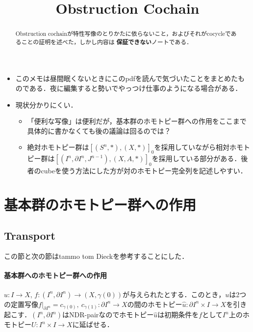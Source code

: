 \documentclass[a4paper,11pt]{jsarticle}
\theoremstyle{definition}
\begin{document}
\begin{itemize}
  \item このメモは昼間眠くないときにこのpdfを読んで気づいたことをまとめたものである．夜に編集すると勢いでやっつけ仕事のようになる場合がある．
  \item 現状分かりにくい．\begin{itemize}
    \item 「便利な写像」は便利だが，基本群のホモトピー群への作用をここまで具体的に書かなくても後の議論は回るのでは？
    \item 絶対ホモトピー群は$[(S^n,*),(X,*)]_0$を採用していながら相対ホモトピー群は$[(I^n,\partial I^n,J^{n-1}),(X,A,*)]_0$を採用している部分がある．後者のcubeを使う方法にした方が対のホモトピー完全列を記述しやすい．
  \end{itemize}
\end{itemize}

\date{}
\title{Obstruction Cochain}

\maketitle

\begin{abstract}
  Obstruction cochainが特性写像のとりかたに依らないこと，およびそれがcocycleであることの証明を述べた，しかし内容は{\HUGE\bfseries \color{red} 保証できない}ノートである．
\end{abstract}
\tableofcontents
\section{基本群のホモトピー群への作用}
\subsection{Transport}
この節と次の節はtammo tom Dieckを参考することにした．

\paragraph{基本群へのホモトピー群への作用}
$u\colon I\to X$, $f\colon(I^n,\partial I^n)\to (X,\gamma(0))$が与えられたとする．このとき，$u$は2つの定置写像$f|_{\partial I^n}=c_{\gamma(0)},\ c_{\gamma(1)}\colon \partial I^n\to X$の間のホモトピー$\hat u\colon \partial I^n\times I\to X$を引き起こす．$(I^n,\partial I^n)$はNDR-pairなのでホモトピー$\hat u$は初期条件を$f$として$I^n$上のホモトピー$U\colon I^n\times I\to X$に延ばせる．
\end{document}
